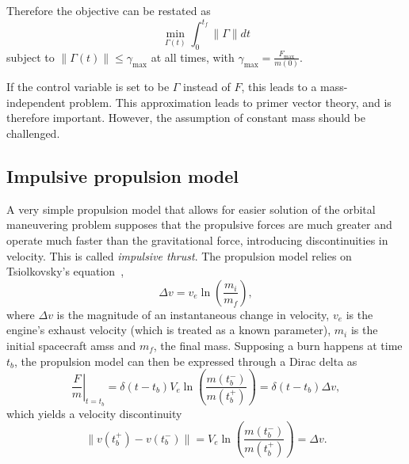 Therefore the objective can be restated as
\begin{equation}\label{eq:obj_continuous_thrust}
    \min_{\Gamma(t)} \int_0^{t_f} \lVert \Gamma \rVert dt
\end{equation}
subject to \(\lVert \Gamma(t) \rVert \leq \gamma_{\max}\) at all times, with \(\gamma_{\max} = \frac{F_{\max}}{m(0)}\).

If the control variable is set to be \(\Gamma\) instead of \(F\), this leads to a mass-independent problem. This approximation leads to primer vector theory, and is therefore important. However, the assumption of constant mass should be challenged.


\subsection{Impulsive propulsion model}


A very simple propulsion model that allows for easier solution of the orbital maneuvering problem supposes that the propulsive forces are much greater and operate much faster than the gravitational force, introducing discontinuities in velocity. This is called \textit{impulsive thrust}. The propulsion model relies on Tsiolkovsky's equation~\cite{Conway_2010}, 
\begin{equation}
    \Delta v = v_e \ln{\left(\frac{m_i}{m_f}\right)},
\end{equation}
where \(\Delta v\) is the magnitude of an instantaneous change in velocity, \(v_e\) is the engine's exhaust velocity (which is treated as a known parameter), \(m_i\) is the initial spacecraft amss and \(m_f\), the final mass. Supposing a burn happens at time \(t_b\), the propulsion model can then be expressed through a Dirac delta as
\begin{equation}
    \left.\frac{F}{m}\right\vert_{t = t_b} = \delta(t - t_b) V_e \ln{\left(\frac{m(t_b^-)}{m(t_b^+)} \right)} = \delta(t - t_b) \Delta v,
\end{equation}
which yields a velocity discontinuity
\begin{equation}
    \lVert v(t_b^+) - v(t_b^-) \rVert = V_e \ln{\left(\frac{m(t_b^-)}{m(t_b^+)}\right)} = \Delta v.
\end{equation}

